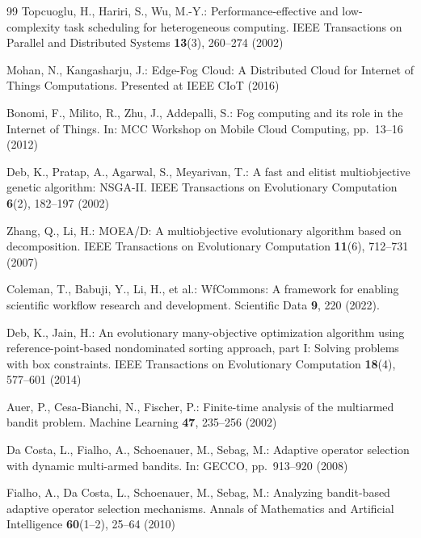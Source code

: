 \documentclass[preprint,12pt]{elsarticle}
\begin{document}
\begin{thebibliography}{99}
\footnotesize
\setlength{\itemsep}{0pt}
\setlength{\parskip}{0pt}
\setlength{\parsep}{0pt}
Topcuoglu, H., Hariri, S., Wu, M.-Y.: Performance-effective and low-complexity task scheduling for heterogeneous computing. IEEE Transactions on Parallel and Distributed Systems \textbf{13}(3), 260--274 (2002)

Mohan, N., Kangasharju, J.: Edge-Fog Cloud: A Distributed Cloud for Internet of Things Computations. Presented at IEEE CIoT (2016)

Bonomi, F., Milito, R., Zhu, J., Addepalli, S.: Fog computing and its role in the Internet of Things. In: MCC Workshop on Mobile Cloud Computing, pp.~13--16 (2012)

Deb, K., Pratap, A., Agarwal, S., Meyarivan, T.: A fast and elitist multiobjective genetic algorithm: NSGA-II. IEEE Transactions on Evolutionary Computation \textbf{6}(2), 182--197 (2002)

Zhang, Q., Li, H.: MOEA/D: A multiobjective evolutionary algorithm based on decomposition. IEEE Transactions on Evolutionary Computation \textbf{11}(6), 712--731 (2007)

Coleman, T., Babuji, Y., Li, H., et al.: WfCommons: A framework for enabling scientific workflow research and development. Scientific Data \textbf{9}, 220 (2022).

Deb, K., Jain, H.: An evolutionary many-objective optimization algorithm using reference-point-based nondominated sorting approach, part I: Solving problems with box constraints. IEEE Transactions on Evolutionary Computation \textbf{18}(4), 577--601 (2014)

Auer, P., Cesa-Bianchi, N., Fischer, P.: Finite-time analysis of the multiarmed bandit problem. Machine Learning \textbf{47}, 235--256 (2002)

Da Costa, L., Fialho, A., Schoenauer, M., Sebag, M.: Adaptive operator selection with dynamic multi-armed bandits. In: GECCO, pp.~913--920 (2008)

Fialho, A., Da Costa, L., Schoenauer, M., Sebag, M.: Analyzing bandit-based adaptive operator selection mechanisms. Annals of Mathematics and Artificial Intelligence \textbf{60}(1--2), 25--64 (2010)


\end{thebibliography}
\end{document}
